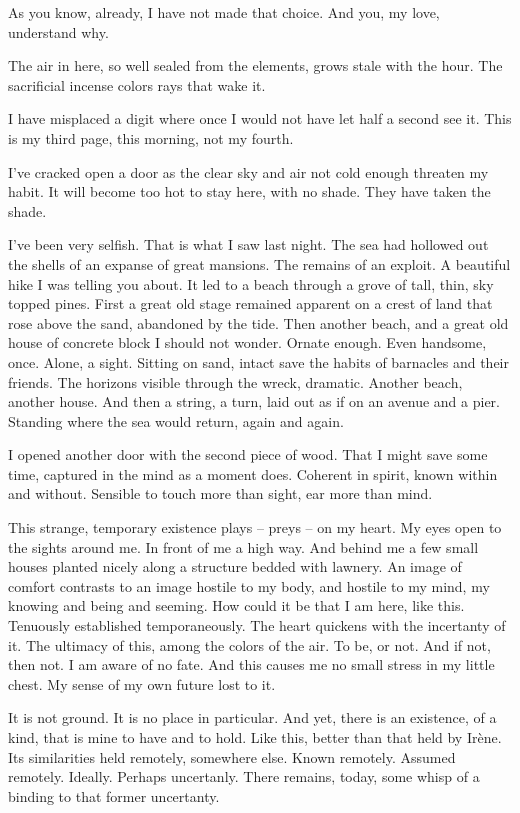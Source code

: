 As you know, already, I have not made that choice.  And you, my love,
understand why.

The air in here, so well sealed from the elements, grows stale with
the hour.  The sacrificial incense colors rays that wake it.

I have misplaced a digit where once I would not have let half a second
see it.  This is my third page, this morning, not my fourth.

I've cracked open a door as the clear sky and air not cold enough
threaten my habit.  It will become too hot to stay here, with no
shade.  They have taken the shade.

I've been very selfish.  That is what I saw last night.  The sea had
hollowed out the shells of an expanse of great mansions.  The remains
of an exploit.  A beautiful hike I was telling you about.  It led to a
beach through a grove of tall, thin, sky topped pines.  First a great
old stage remained apparent on a crest of land that rose above the
sand, abandoned by the tide.  Then another beach, and a great old
house of concrete block I should not wonder.  Ornate enough.  Even
handsome, once.  Alone, a sight.  Sitting on sand, intact save the
habits of barnacles and their friends.  The horizons visible through
the wreck, dramatic.  Another beach, another house.  And then a string,
a turn, laid out as if on an avenue and a pier.  Standing where the
sea would return, again and again.

I opened another door with the second piece of wood.  That I might
save some time, captured in the mind as a moment does.  Coherent in
spirit, known within and without.  Sensible to touch more than sight,
ear more than mind.

This strange, temporary existence plays -- preys -- on my heart.  My
eyes open to the sights around me.  In front of me a high way.  And
behind me a few small houses planted nicely along a structure bedded
with lawnery.  An image of comfort contrasts to an image hostile to my
body, and hostile to my mind, my knowing and being and seeming.  How
could it be that I am here, like this.  Tenuously established
temporaneously.  The heart quickens with the incertanty of it.  The
ultimacy of this, among the colors of the air.  To be, or not.  And if
not, then not.  I am aware of no fate.  And this causes me no small
stress in my little chest.  My sense of my own future lost to it.

It is not ground.  It is no place in particular.  And yet, there is an
existence, of a kind, that is mine to have and to hold.  Like this,
better than that held by Ir\`{e}ne.  Its similarities held remotely,
somewhere else.  Known remotely.  Assumed remotely.  Ideally.  Perhaps
uncertanly.  There remains, today, some whisp of a binding to that
former uncertanty.

